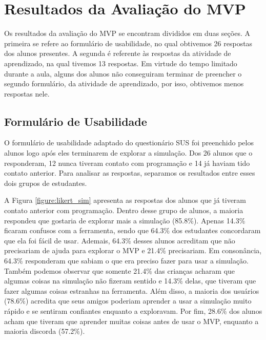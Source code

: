 
\chapter{Resultados da Avaliação do MVP}

Os resultados da avaliação do MVP se encontram divididos em duas seções. A primeira se refere ao formulário de usabilidade, no qual obtivemos 26 respostas dos alunos presentes. A segunda é referente às respostas da atividade de aprendizado, na qual tivemos 13 respostas. Em virtude do tempo limitado durante a aula, alguns dos alunos não conseguiram terminar de preencher o segundo formulário, da atividade de aprendizado, por isso, obtivemos menos respostas nele.

\section{Formulário de Usabilidade}

O formulário de usabilidade adaptado do questionário SUS foi preenchido pelos alunos logo após eles terminarem de explorar a simulação. Dos 26 alunos que o responderam, 12 nunca tiveram contato com programação e 14 já haviam tido contato anterior. Para analisar as respostas, separamos os resultados entre esses dois grupos de estudantes.

A Figura \ref{figure:likert_sim} apresenta as respostas dos alunos que já tiveram contato anterior com programação. Dentro desse grupo de alunos, a maioria respondeu que gostaria de explorar mais a simulação (85.8\%). Apenas 14.3\% ficaram confusos com a ferramenta, sendo que 64.3\% dos estudantes concordaram que ela foi fácil de usar. Ademais, 64.3\% desses alunos acreditam que não precisariam de ajuda para explorar o MVP e 21.4\% precisariam. Em consonância, 64.3\% responderam que sabiam o que era preciso fazer para usar a simulação. Também podemos observar que somente 21.4\% das crianças acharam que algumas coisas na simulação não fizeram sentido e 14.3\% delas, que tiveram que fazer algumas coisas estranhas na ferramenta. Além disso, a maioria dos usuários (78.6\%) acredita que seus amigos poderiam aprender a usar a simulação muito rápido e se sentiram confiantes enquanto a exploravam. Por fim, 28.6\% dos alunos acham que tiveram que aprender muitas coisas antes de usar o MVP, enquanto a maioria discorda (57.2\%).

